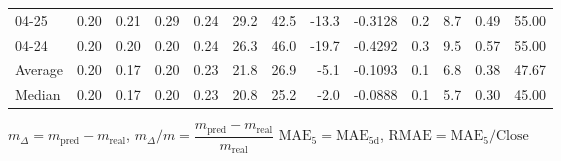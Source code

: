\begin{threeparttable}
{\begin{tabular}{lrrrrrrrrrrrr}
  04-25 &          0.20 &          0.21 &          0.29 &        0.24 &                29.2 &                42.5 &      -13.3 &      -0.3128 &                 0.2 &              8.7 &            0.49 &                  55.00 \\
  04-24 &          0.20 &          0.20 &          0.20 &        0.24 &                26.3 &                46.0 &      -19.7 &      -0.4292 &                 0.3 &              9.5 &            0.57 &                  55.00 \\
Average &          0.20 &          0.17 &          0.20 &        0.23 &                21.8 &                26.9 &       -5.1 &      -0.1093 &                 0.1 &              6.8 &            0.38 &                  47.67 \\
 Median &          0.20 &          0.17 &          0.20 &        0.23 &                20.8 &                25.2 &       -2.0 &      -0.0888 &                 0.1 &              5.7 &            0.30 &                  45.00 \\
\bottomrule
\end{tabular}
}
\begin{tablenotes}\footnotesize
\item $m_\Delta=m_{\text{pred}}-m_{\text{real}}$,
$m_\Delta/m=\dfrac{m_{\text{pred}}-m_{\text{real}}}{m_{\text{real}}}$
$\mathrm{MAE}_5=\mathrm{MAE}_{5\text{d}}$,
$\mathrm{RMAE}=\mathrm{MAE}_5/\text{Close}$
\end{tablenotes}
\end{threeparttable}
\endgroup

